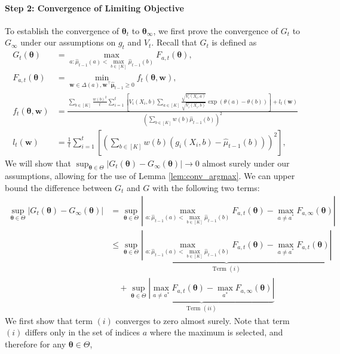 \documentclass{article}
\begin{document}
\begin{appendices}
\paragraph{Step 2: Convergence of Limiting Objective}

To establish the convergence of $\bm{\theta}_{t}$ to $\bm{\theta}_\infty$, we first prove the convergence of $G_t$ to $G_\infty$ under our assumptions on $g_t$ and $V_t$. Recall that  $G_t$ is defined as
\begin{align}
    G_t(\bm{\theta}) &=  \max_{a: \hat\mu_{t-1}(a) < \max_{b \in [K]} \hat\mu_{t-1}(b)} F_{a,t}(\bm\theta), \\
    F_{a,t}(\bm\theta) &= \min_{\bm{w} \in \Delta(a), \bm{w}^\top \hat{\bm\mu}_{t-1} \geq 0} f_{t}(\bm{\theta}, \bm{w}), \\
    f_{t}(\bm\theta, \bm{w}) &= \frac{ \sum_{b \in [K]} \frac{w(b)^2}{t} \sum_{i=1}^t\left[V_i(X_i,b)\sum_{a \in [K]}\frac{ \sqrt{V_i(X_i,a) } }{\sqrt{V_i(X_i,b) } }\exp\left(\theta(a) - \theta(b)\right)\right] + l_t(\bm{w})}{\left(\sum_{b \in [K]} w(b)  \hat\mu_{t-1}(b) \right)^2} \\
    l_t(\bm{w}) &= \frac{1}{t}\sum_{i=1}^t\left[ \left(\sum_{b \in [K]} w(b) (g_i(X_i,b)- \hat\mu_{t-1}(b)) \right)^2 \right],
\end{align}
We will show that $\sup_{\bm{\theta}\in \Theta}|G_t(\bm\theta)-G_\infty(\bm{\theta})| \rightarrow 0$ almost surely under our assumptions, allowing for the use of Lemma \ref{lem:conv_argmax}. We can upper bound the difference between $G_t$ and $G$ with the following two terms:
\begin{align}
    \sup_{\bm\theta \in \Theta}|G_t(\bm\theta) - G_\infty(\bm{\theta})|&=  \sup_{\bm\theta \in \Theta}\left| \max_{a: \hat\mu_{t-1}(a) < \max_{b \in [K]} \hat\mu_{t-1}(b)} F_{a,t}(\bm\theta) - \max_{a \neq a^*} F_{a, \infty}(\bm{\theta}) \right|\\
    &\leq 
    \underbrace{\sup_{\bm\theta \in \Theta}\left| \max_{a: \hat\mu_{t-1}(a) < \max_{b \in [K]} \hat\mu_{t-1}(b)} F_{a, t}(\bm{\theta})-\max_{a \neq a^*} F_{a, t}(\bm{\theta}) \right|}_{\text{Term $(i)$}}\\
    &\quad + \underbrace{\sup_{\bm\theta \in \Theta}\left| \max_{a \neq a^*} F_{a,t}(\bm\theta) - \max_{a^*} F_{a, \infty}(\bm{\theta}) \right| }_{\text{Term $(ii)$}}\label{eq:term_2}
\end{align}
We first show that term $(i)$ converges to zero almost surely. Note that term $(i)$ differs only in the set of indices $a$ where the maximum is selected, and therefore for any $\bm{\theta} \in \Theta$, 


\end{appendices}
\end{document}
